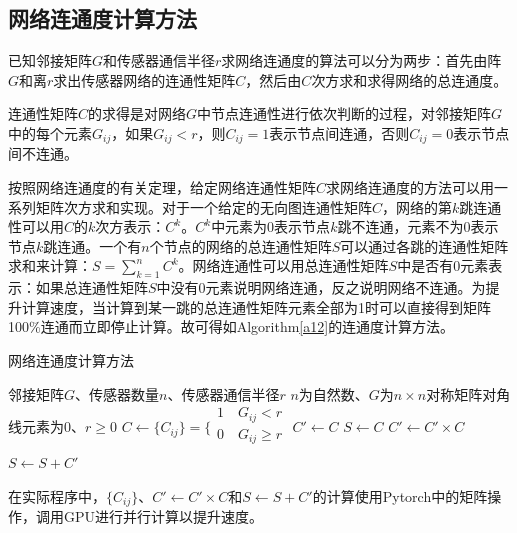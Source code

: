 \documentclass[a4paper]{ctexart}
\begin{document}
\begin{spacing}{1}
\subsection{网络连通度计算方法}
已知邻接矩阵$G$和传感器通信半径$r$求网络连通度的算法可以分为两步：首先由阵$G$和离$r$求出传感器网络的连通性矩阵$C$，然后由$C$次方求和求得网络的总连通度。

连通性矩阵$C$的求得是对网络$G$中节点连通性进行依次判断的过程，对邻接矩阵$G$中的每个元素$G_{ij}$，如果$G_{ij}<r$，则$C_{ij}=1$表示节点间连通，否则$C_{ij}=0$表示节点间不连通。

按照网络连通度的有关定理，给定网络连通性矩阵$C$求网络连通度的方法可以用一系列矩阵次方求和实现。对于一个给定的无向图连通性矩阵$C$，网络的第$k$跳连通性可以用$C$的$k$次方表示：$C^k$。$C^k$中元素为0表示节点$k$跳不连通，元素不为0表示节点$k$跳连通。一个有$n$个节点的网络的总连通性矩阵$S$可以通过各跳的连通性矩阵求和来计算：$S=\sum_{k=1}^n C^k$。网络连通性可以用总连通性矩阵$S$中是否有0元素表示：如果总连通性矩阵$S$中没有0元素说明网络连通，反之说明网络不连通。为提升计算速度，当计算到某一跳的总连通性矩阵元素全部为1时可以直接得到矩阵100\%连通而立即停止计算。故可得如Algorithm\ref{a12}的连通度计算方法。
\begin{algorithm}
	\caption{网络连通度计算方法}
	\label{a12}
	\begin{algorithmic}[1]
		\Require 邻接矩阵$G$、传感器数量$n$、传感器通信半径$r$
		\Ensure $n$为自然数、$G$为$n\times n$对称矩阵对角线元素为0、$r\ge 0$
		\State $C\gets \{C_{ij}\}=\{
		\begin{array}{r}
		1\quad G_{ij}<r\\
		0\quad G_{ij}\ge r\\
		\end{array}$
		\State $C'\gets C$
		\State $S\gets C$
		\State {}
		\EndIf
		\State $C'\gets C'\times C$
		\State $S\gets S+C'$
		\EndFor
		\State {}
		\EndIf
		\State {}
		\EndFunction
	\end{algorithmic}
\end{algorithm}
在实际程序中，$\{C_{ij}\}$、$C'\gets C'\times C$和$S\gets S+C'$的计算使用Pytorch中的矩阵操作，调用GPU进行并行计算以提升速度。


\end{spacing}
\end{document}
